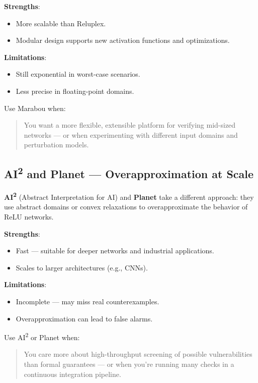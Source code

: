 \textbf{Strengths}:
\begin{itemize}
  \item More scalable than Reluplex.
  \item Modular design supports new activation functions and optimizations.
\end{itemize}

\textbf{Limitations}:
\begin{itemize}
  \item Still exponential in worst-case scenarios.
  \item Less precise in floating-point domains.
\end{itemize}

Use Marabou when:
\begin{quote}
You want a more flexible, extensible platform for verifying mid-sized networks — or when experimenting with different input domains and perturbation models.
\end{quote}

\subsection{AI\textsuperscript{2} and Planet — Overapproximation at Scale}

\textbf{AI\textsuperscript{2}} (Abstract Interpretation for AI) and \textbf{Planet} take a different approach: they use abstract domains or convex relaxations to overapproximate the behavior of ReLU networks.

\textbf{Strengths}:
\begin{itemize}
  \item Fast — suitable for deeper networks and industrial applications.
  \item Scales to larger architectures (e.g., CNNs).
\end{itemize}

\textbf{Limitations}:
\begin{itemize}
  \item Incomplete — may miss real counterexamples.
  \item Overapproximation can lead to false alarms.
\end{itemize}

Use AI\textsuperscript{2} or Planet when:
\begin{quote}
You care more about high-throughput screening of possible vulnerabilities than formal guarantees — or when you're running many checks in a continuous integration pipeline.
\end{quote}

